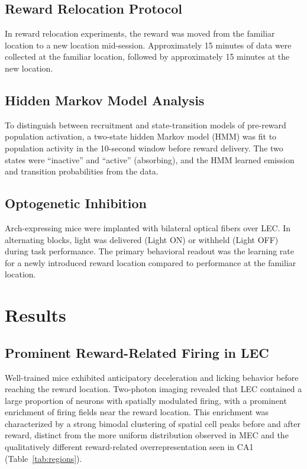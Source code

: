 \documentclass[12pt]{article}
\begin{document}
\subsection{Reward Relocation Protocol}

In reward relocation experiments, the reward was moved from the familiar location to a new location mid-session. Approximately 15 minutes of data were collected at the familiar location, followed by approximately 15 minutes at the new location.

\subsection{Hidden Markov Model Analysis}

To distinguish between recruitment and state-transition models of pre-reward population activation, a two-state hidden Markov model (HMM) was fit to population activity in the 10-second window before reward delivery. The two states were ``inactive'' and ``active'' (absorbing), and the HMM learned emission and transition probabilities from the data.

\subsection{Optogenetic Inhibition}

Arch-expressing mice were implanted with bilateral optical fibers over LEC. In alternating blocks, light was delivered (Light ON) or withheld (Light OFF) during task performance. The primary behavioral readout was the learning rate for a newly introduced reward location compared to performance at the familiar location.

\section{Results}

\subsection{Prominent Reward-Related Firing in LEC}

Well-trained mice exhibited anticipatory deceleration and licking behavior before reaching the reward location. Two-photon imaging revealed that LEC contained a large proportion of neurons with spatially modulated firing, with a prominent enrichment of firing fields near the reward location. This enrichment was characterized by a strong bimodal clustering of spatial cell peaks before and after reward, distinct from the more uniform distribution observed in MEC and the qualitatively different reward-related overrepresentation seen in CA1 (Table~\ref{tab:regions}).
\end{document}
